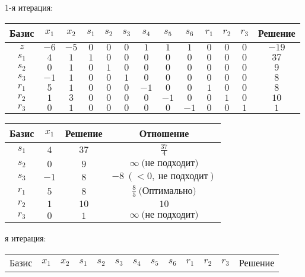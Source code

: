 \documentclass{article}%
\begin{document}
\begin{flushleft}%
1{-}я итерация: %
\newline%
\newline%
\renewcommand{\arraystretch}{1.3}%
\begin{tabular}{|c|ccccccccccc|c|}%
\hline%
Базис&$x_{1}$&$x_{2}$&$s_{1}$&$s_{2}$&$s_{3}$&$s_{4}$&$s_{5}$&$s_{6}$&$r_{1}$&$r_{2}$&$r_{3}$&Решение\\%
\hline%
$z$&$-6$&$-5$&$0$&$0$&$0$&$1$&$1$&$1$&$0$&$0$&$0$&$-19$\\%
\hline%
$s_{1}$&$4$&$1$&$1$&$0$&$0$&$0$&$0$&$0$&$0$&$0$&$0$&$37$\\%
$s_{2}$&$0$&$1$&$0$&$1$&$0$&$0$&$0$&$0$&$0$&$0$&$0$&$9$\\%
$s_{3}$&$-1$&$1$&$0$&$0$&$1$&$0$&$0$&$0$&$0$&$0$&$0$&$8$\\%
$r_{1}$&$5$&$1$&$0$&$0$&$0$&$-1$&$0$&$0$&$1$&$0$&$0$&$8$\\%
$r_{2}$&$1$&$3$&$0$&$0$&$0$&$0$&$-1$&$0$&$0$&$1$&$0$&$10$\\%
$r_{3}$&$0$&$1$&$0$&$0$&$0$&$0$&$0$&$-1$&$0$&$0$&$1$&$1$\\%
\hline%
\end{tabular}%
\newline%
\newline%
\newline%
\begin{tabular}{|cccc|}%
\hline%
Базис&$x_{1}$&Решение&Отношение\\%
\hline%
$s_{1}$&$4$&$37$&$\frac{37}{4}$\\%
$s_{2}$&$0$&$9$&$\infty \: \text{(не подходит)}$\\%
$s_{3}$&$-1$&$8$&$-8\: (< 0, \: \text{не подходит})$\\%
$r_{1}$&$5$&$8$&$\frac{8}{5}\: \text{(Оптимально)}$\\%
$r_{2}$&$1$&$10$&$10$\\%
$r_{3}$&$0$&$1$&$\infty \: \text{(не подходит)}$\\%
\hline%
\end{tabular}%
\newline%
\newline%
я итерация: %
\newline%
\newline%
\renewcommand{\arraystretch}{1.3}%
\begin{tabular}{|c|ccccccccccc|c|}%
\hline%
Базис&$x_{1}$&$x_{2}$&$s_{1}$&$s_{2}$&$s_{3}$&$s_{4}$&$s_{5}$&$s_{6}$&$r_{1}$&$r_{2}$&$r_{3}$&Решение\\%

\end{tabular}
\end{flushleft}
\end{document}
